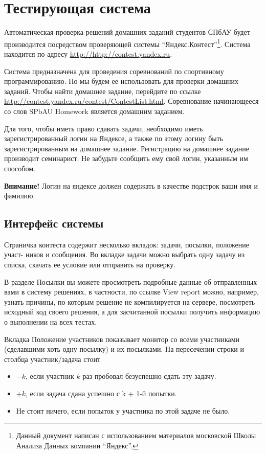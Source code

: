 \documentclass[12pt]{article}
\begin{document}
\section{Тестирующая система}

Автоматическая проверка решений домашних заданий студентов СПбАУ будет 
производится посредством проверяющей системы ``Яндекс.Контест''\footnote{Данный документ написан с использованием материалов московской Школы Анализа Данных компании ``Яндекс''.}. 
Система находится по адресу \url{http://http://contest.yandex.ru}.

Система предназначена для проведения соревнований по спортивному
программированию. Но мы будем ее использовать для проверки домашних
заданий. Чтобы найти домашнее задание, перейдите по ссылке
\url{http://contest.yandex.ru/contest/ContestList.html}.
Соревнование начинающееся со слов SPbAU Homework является
домашним заданием.

Для того, чтобы иметь право сдавать задачи, необходимо иметь зарегистрированный
логин на Яндексе, а также по этому логину быть зарегистрированным на домашнее 
задание. Регистрацию на домашнее задание производит семинарист. Не забудьте 
сообщить ему свой логин, указанным им способом.

\textbf{Внимание!} Логин на яндексе должен содержать в качестве подстрок
ваши имя и фамилию.

\subsection{Интерфейс системы}
\label{interface}

Страничка контеста содержит несколько вкладок: задачи, посылки, положение участ-
ников и сообщения. Во вкладке задачи можно выбрать одну задачу из списка, скачать
ее условие или отправить на проверку.

В разделе Посылки вы можете просмотреть подробные данные об отправленных
вами в систему решениях, в частности, по ссылке View report можно, например, узнать
причины, по которым решение не компилируется на сервере, посмотреть исходный код
своего решения, а для засчитанной посылки  получить информацию о выполнении
на всех тестах.

Вкладка Положение участников показывает монитор со всеми участниками (сделавшими хоть 
одну посылку) и их посылками. На пересечении строки и столбца участник/задача стоит
\begin{itemize}
\item $-k$, если участник $k$ раз пробовал безуспешно сдать эту задачу.
\item $+k$, если задача сдана успешно с k + 1-й попытки.
\item Не стоит ничего, если попыток у участника по этой задаче не было. 
\end{itemize}
\end{document}
